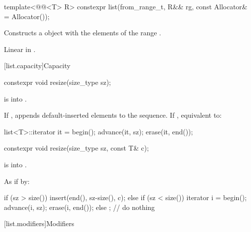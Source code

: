 %
\begin{itemdecl}
template<@@<T> R>
  constexpr list(from_range_t, R&& rg, const Allocator& = Allocator());
\end{itemdecl}

\begin{itemdescr}
\pnum
\effects
Constructs a  object with the elements of the range .

\pnum
\complexity
Linear in .
\end{itemdescr}

[list.capacity]{Capacity}

%
\begin{itemdecl}
constexpr void resize(size_type sz);
\end{itemdecl}

\begin{itemdescr}
\pnum
\expects
{} is  into .

\pnum
\effects
If ,
appends  default-inserted elements to the
sequence.
If , equivalent to:

\begin{codeblock}
list<T>::iterator it = begin();
advance(it, sz);
erase(it, end());
\end{codeblock}
\end{itemdescr}

%
\begin{itemdecl}
constexpr void resize(size_type sz, const T& c);
\end{itemdecl}

\begin{itemdescr}
\pnum
\expects
{} is  into .

\pnum
\effects
As if by:
\begin{codeblock}
if (sz > size())
  insert(end(), sz-size(), c);
else if (sz < size()) {
  iterator i = begin();
  advance(i, sz);
  erase(i, end());
}
else
  ;                 // do nothing
\end{codeblock}
\end{itemdescr}

[list.modifiers]{Modifiers}

